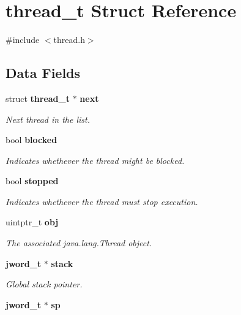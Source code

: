 \section{thread\_\-t Struct Reference}
\label{structthread__t}


{\ttfamily \#include $<$thread.h$>$}

\subsection*{Data Fields}
\begin{DoxyCompactItemize}
\item 
struct {\bf thread\_\-t} $\ast$ {\bf next}\label{structthread__t_a8ac79fa9371166cb444f5695424f19e6}

\begin{DoxyCompactList}\small\item\em Next thread in the list. \item\end{DoxyCompactList}\item 
bool {\bf blocked}\label{structthread__t_af37c6a38bd31088945e7ea9fde1bfe7c}

\begin{DoxyCompactList}\small\item\em Indicates whethever the thread might be blocked. \item\end{DoxyCompactList}\item 
bool {\bf stopped}\label{structthread__t_ad1fb4ee527c847541b93d5a627dd2b52}

\begin{DoxyCompactList}\small\item\em Indicates whethever the thread must stop execution. \item\end{DoxyCompactList}\item 
uintptr\_\-t {\bf obj}\label{structthread__t_aa87a38d6f066fafca225292e44e22df0}

\begin{DoxyCompactList}\small\item\em The associated java.lang.Thread object. \item\end{DoxyCompactList}\item 
{\bf jword\_\-t} $\ast$ {\bf stack}\label{structthread__t_aae4fa8c0a34d467b19691a1065490b49}

\begin{DoxyCompactList}\small\item\em Global stack pointer. \item\end{DoxyCompactList}\item 
{\bf jword\_\-t} $\ast$ {\bf sp}\label{structthread__t_a394d501de4245e192c487f9ab5672a9c}


\end{DoxyCompactItemize}
